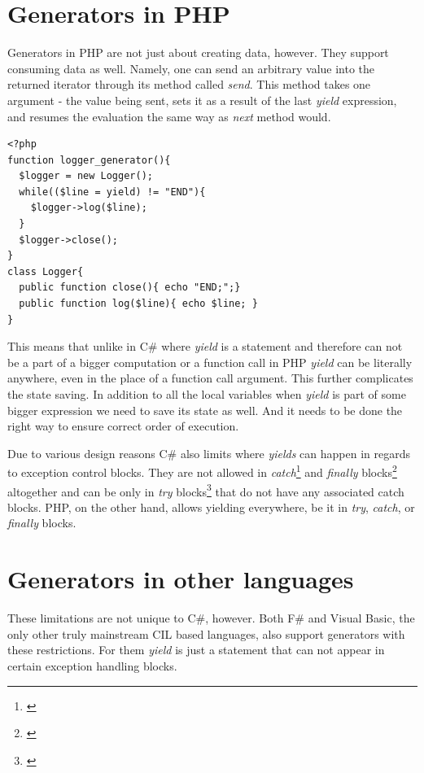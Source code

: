 \section{Generators in PHP}

Generators in PHP are not just about creating data, however. They support consuming data as well. Namely, one can send an arbitrary value into the returned iterator through its method called \emph{send}. This method takes one argument - the value being sent, sets it as a result of the last \emph{yield} expression, and resumes the evaluation the same way as \emph{next} method would.

\begin{verbatim}
<?php
function logger_generator(){
  $logger = new Logger();
  while(($line = yield) != "END"){
    $logger->log($line);
  }
  $logger->close();
}
class Logger{
  public function close(){ echo "END;";}
  public function log($line){ echo $line; }
}
\end{verbatim}

This means that unlike in C\# where \emph{yield} is a statement and therefore can not be a part of a bigger computation or a function call in PHP \emph{yield} can be literally anywhere, even in the place of a function call argument. This further complicates the state saving. In addition to all the local variables when \emph{yield} is part of some bigger expression we need to save its state as well. And it needs to be done the right way to ensure correct order of execution.

Due to various design reasons \citep{CSharpYieldFinaly} C\# also limits where \emph{yields} can happen in regards to exception control blocks. They are not allowed in \emph{catch}\footnote{\citep{CSharpYieldCatch}} and \emph{finally} blocks\footnote{\citep{CSharpYieldFinaly}} altogether and can be only in \emph{try} blocks\footnote{\citep{CSharpYieldTry}} that do not have any associated catch blocks. PHP, on the other hand, allows yielding everywhere, be it in \emph{try}, \emph{catch}, or \emph{finally} blocks.

\section{Generators in other languages}

These limitations are not unique to C\#, however. Both F\# and Visual Basic, the only other truly mainstream CIL based languages, also support generators with these restrictions. For them \emph{yield} is just a statement that can not appear in certain exception handling blocks.

